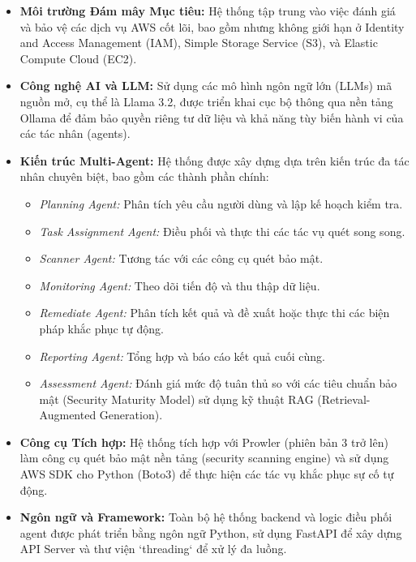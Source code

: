 \begin{itemize}
    \item \textbf{Môi trường Đám mây Mục tiêu:} Hệ thống tập trung vào việc đánh giá và bảo vệ các dịch vụ AWS cốt lõi, bao gồm nhưng không giới hạn ở Identity and Access Management (IAM), Simple Storage Service (S3), và Elastic Compute Cloud (EC2).
    
    \item \textbf{Công nghệ AI và LLM:} Sử dụng các mô hình ngôn ngữ lớn (LLMs) mã nguồn mở, cụ thể là Llama 3.2, được triển khai cục bộ thông qua nền tảng Ollama để đảm bảo quyền riêng tư dữ liệu và khả năng tùy biến hành vi của các tác nhân (agents).
    
    \item \textbf{Kiến trúc Multi-Agent:} Hệ thống được xây dựng dựa trên kiến trúc đa tác nhân chuyên biệt, bao gồm các thành phần chính:
    \begin{itemize}
        \item \textit{Planning Agent:} Phân tích yêu cầu người dùng và lập kế hoạch kiểm tra.
        \item \textit{Task Assignment Agent:} Điều phối và thực thi các tác vụ quét song song.
        \item \textit{Scanner Agent:} Tương tác với các công cụ quét bảo mật.
        \item \textit{Monitoring Agent:} Theo dõi tiến độ và thu thập dữ liệu.
        \item \textit{Remediate Agent:} Phân tích kết quả và đề xuất hoặc thực thi các biện pháp khắc phục tự động.
        \item \textit{Reporting Agent:} Tổng hợp và báo cáo kết quả cuối cùng.
        \item \textit{Assessment Agent:} Đánh giá mức độ tuân thủ so với các tiêu chuẩn bảo mật (Security Maturity Model) sử dụng kỹ thuật RAG (Retrieval-Augmented Generation).
    \end{itemize}
    
    \item \textbf{Công cụ Tích hợp:} Hệ thống tích hợp với Prowler (phiên bản 3 trở lên) làm công cụ quét bảo mật nền tảng (security scanning engine) và sử dụng AWS SDK cho Python (Boto3) để thực hiện các tác vụ khắc phục sự cố tự động.
    
    \item \textbf{Ngôn ngữ và Framework:} Toàn bộ hệ thống backend và logic điều phối agent được phát triển bằng ngôn ngữ Python, sử dụng FastAPI để xây dựng API Server và thư viện `threading` để xử lý đa luồng.
\end{itemize}

